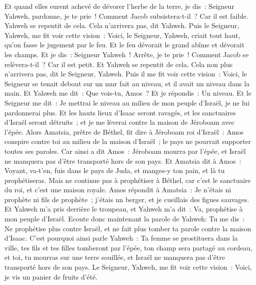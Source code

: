 \begin{multicols}{2}
Et quand elles eurent achevé de dévorer l'herbe de la terre, je dis~: Seigneur Yahweh, pardonne, je te prie~! Comment Jacob subsistera-t-il~? Car il est faible.
Yahweh se repentit de cela. Cela n'arrivera pas, dit Yahweh.
Puis le Seigneur, Yahweh, me fit voir cette vision~: Voici, le Seigneur, Yahweh, criait tout haut, qu'on fasse le jugement par le feu. Et le feu dévorait le grand abîme et dévorait les champs.
Et je dis~: Seigneur Yahweh~! Arrête, je te prie~! Comment Jacob se relèvera-t-il~? Car il est petit.
Et Yahweh se repentit de cela. Cela non plus n'arrivera pas, dit le Seigneur, Yahweh.
Puis il me fit voir cette vision~: Voici, le Seigneur se tenait debout sur un mur fait au niveau, et il avait un niveau dans la main.
Et Yahweh me dit~: Que vois-tu, Amos~? Et je répondis~: Un niveau. Et le Seigneur me dit~: Je mettrai le niveau au milieu de mon peuple d'Israël, je ne lui pardonnerai plus.
Et les hauts lieux d'Isaac seront ravagés, et les sanctuaires d'Israël seront détruits~; et je me lèverai contre la maison de Jéroboam avec l'épée.
Alors Amatsia, prêtre de Béthel, fit dire à Jéroboam roi d'Israël~: Amos conspire contre toi au milieu de la maison d'Israël~; le pays ne pourrait supporter toutes ses paroles.
Car ainsi a dit Amos~: Jéroboam mourra par l'épée, et Israël ne manquera pas d'être transporté hors de son pays.
Et Amatsia dit à Amos~: Voyant, va-t'en, fuis dans le pays de Juda, et manges-y ton pain, et là tu prophétiseras.
Mais ne continue pas à prophétiser à Béthel, car c'est le sanctuaire du roi, et c'est une maison royale.
Amos répondit à Amatsia~: Je n'étais ni prophète ni fils de prophète~; j'étais un berger, et je cueillais des figues sauvages.
Et Yahweh m'a pris derrière le troupeau, et Yahweh m'a dit~: Va, prophétise à mon peuple d'Israël.
Ecoute donc maintenant la parole de Yahweh: Tu me dis~: Ne prophétise plus contre Israël, et ne fait plus tomber ta parole contre la maison d'Isaac.
C'est pourquoi ainsi parle Yahweh~: Ta femme se prostituera dans la ville, tes fils et tes filles tomberont par l'épée, ton champ sera partagé au cordeau, et toi, tu mourras sur une terre souillée, et Israël ne manquera pas d'être transporté hors de son pays.
\VerseOne{}Le Seigneur, Yahweh, me fit voir cette vision~: Voici, je vis un panier de fruits d'été.

\end{multicols}
